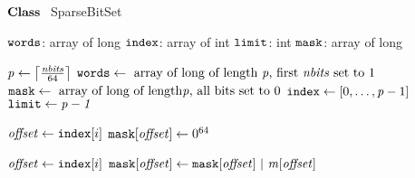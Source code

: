     \STATE $\textbf{Class~}$ SparseBitSet
    \item[]
      \STATE $\texttt{words}$: array of long  \label{line:sbsfield:start}
      \STATE $\texttt{index}$: array of int 
      \STATE $\texttt{limit}$: int 
      \STATE $\texttt{mask}$: array of long  \label{line:sbsfield:end}

    \item[]
     \label{line:initsbs:start}
      \STATE $\mathit{p} \leftarrow \left\lceil\frac{\mathit{nbits}}{64}\right\rceil$
      \STATE $\texttt{words} \leftarrow \text{~array of long of length~} \mathit{p} \text{, first~} 
      \mathit{nbits} \text{~set to 1}$
      \STATE $\texttt{mask} \leftarrow \text{~array of long of length} \mathit{p} \text{, all bits set to~}0$
      \STATE $\texttt{index} \leftarrow [0, \ldots, \mathit{p} - 1]$
      \STATE $\texttt{limit} \leftarrow \mathit{p-1}$ \label{line:initsbs:end}
      \Endfunc

    \item[]
       \label{line:isEmpty:1}
       \label{line:isEmpty:2}
      \Endfunc
    \item[]
       \label{line:clearMask:1}
       \label{line:clearMask:2}
        \STATE $\mathit{offset} \leftarrow \texttt{index}[i]$ \label{line:clearMask:3}
        \STATE $\texttt{mask}[\mathit{offset}] \leftarrow 0^{64}$ \label{line:clearMask:4}
      \ENDFOR
      \Endfunc


    \item[]
       \label{line:addToMask:1}
       \label{line:addToMask:2}
      \STATE $\mathit{offset} \leftarrow \texttt{index}[i]$ \label{line:addToMask:3}
      \STATE $\texttt{mask}[\localvar{offset}] \leftarrow \texttt{mask}[\localvar{offset}] \ | \ 
      \localvar{m}[\localvar{offset}]$  \label{line:addToMask:4}
      \ENDFOR
      \Endfunc

